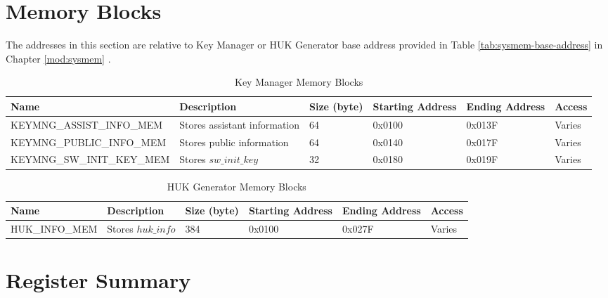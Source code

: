 \documentclass[main\_\_EN.tex]{subfiles}
\begin{document}
\section{Memory Blocks}

The addresses in this section are relative to Key Manager or HUK Generator base address provided in Table \ref{tab:sysmem-base-address} in Chapter \ref{mod:sysmem} \textit{}.

\begin{longtable}{ | p{4.6cm} | p{4.3cm} | R{1cm} | R{1.5cm} | R{1.5cm} | R{1.2cm} | }
\caption{Key Manager Memory Blocks} \label{tab:keymng-mem-blocks}
\\ \hline
{}
\textbf{Name} & \textbf{Description}  &  \textbf{Size (byte)}  &  \textbf{Starting Address}  &  \textbf{Ending Address}  & \textbf{Access}   \\ \hline
KEYMNG\_ASSIST\_INFO\_MEM\label{mem:keymng-assist-info} & Stores assistant information &   64  &  0x0100  &  0x013F  &  Varies  \\ \hline
KEYMNG\_PUBLIC\_INFO\_MEM\label{mem:keymng-public-info} & Stores public information    &   64  &  0x0140  &  0x017F  &  Varies  \\ \hline
KEYMNG\_SW\_INIT\_KEY\_MEM\label{mem:keymng-sw-init-key} & Stores \begin{math}sw\_init\_key\end{math}  &   32  &  0x0180  &  0x019F  &  Varies  \\ \hline
\end{longtable}

\begin{longtable}{ | p{4.6cm} | p{4.3cm} | R{1cm} | R{1.5cm} | R{1.5cm} | R{1.2cm} | }
\caption{HUK Generator Memory Blocks} \label{tab:huk-mem-blocks}
\\ \hline
{}
\textbf{Name} & \textbf{Description}  &  \textbf{Size (byte)}  &  \textbf{Starting Address}  &  \textbf{Ending Address}  & \textbf{Access}   \\ \hline
HUK\_INFO\_MEM\label{mem:huk-info} & Stores \hyperref[para:hukinfo]{\begin{math}huk\_info\end{math}}  &  384  &  0x0100  &  0x027F  &  Varies  \\ \hline
\end{longtable}

\section{Register Summary}
\label{sec:keymng-reg-summ}
\end{document}
